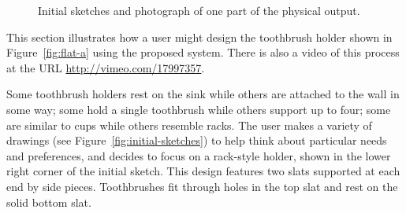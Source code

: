 \documentclass[12pt]{article}
\begin{document}
\begin{figure}[] 
\centering
{}
\hspace{5mm} 
\hspace{5mm} 
\caption{Initial sketches and photograph of one part of the physical
  output.}
\label{fig:physical-sketches}
\end{figure}

This section illustrates how a user might design the toothbrush holder
shown in Figure~\ref{fig:flat-a} using the proposed system. There is
also a video of this process at the URL
\href{http://vimeo.com/17997357}{http://vimeo.com/17997357}.

Some toothbrush holders rest on the sink while others are attached to
the wall in some way; some hold a single toothbrush while others
support up to four; some are similar to cups while others resemble
racks. The user makes a variety of drawings (see
Figure~\ref{fig:initial-sketches}) to help think about particular
needs and preferences, and decides to focus on a rack-style holder,
shown in the lower right corner of the initial sketch. This design
features two slats supported at each end by side pieces. Toothbrushes
fit through holes in the top slat and rest on the solid bottom slat.
\end{document}

